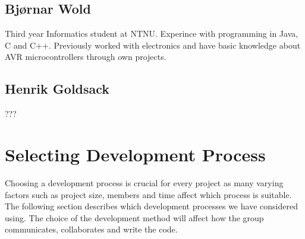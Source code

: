 \subsection{Bjørnar Wold}
Third year Informatics student at NTNU. Experince with programming in Java, C and C++. Previously worked with electronics and have basic knowledge about AVR microcontrollers through own projects.

\subsection{Henrik Goldsack}
???

\newpage
\section{Selecting Development Process}
Choosing a development process is crucial for every project as many varying factors such as
project size, members and time affect which process is suitable. The following section describes
which development processes we have considered using. The choice of the development method
will affect how the group communicates, collaborates and write the code.


